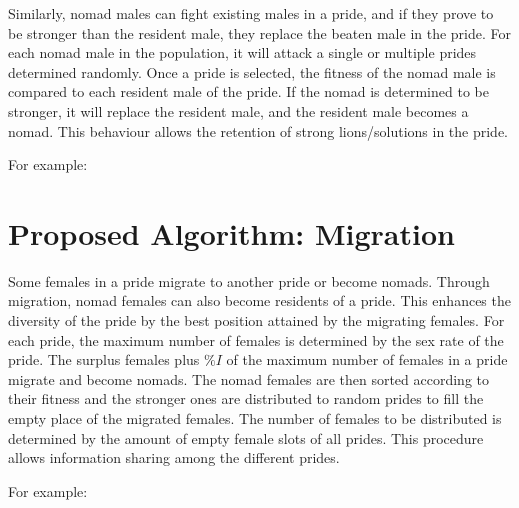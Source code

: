 Similarly, nomad males can fight existing males in a pride, and if they prove to be stronger than the resident male, they replace the beaten male in the pride. For each nomad male in the population, it will attack a single or multiple prides determined randomly. Once a pride is selected, the fitness of the nomad male is compared to each resident male of the pride. If the nomad is determined to be stronger, it will replace the resident male, and the resident male becomes a nomad. This behaviour allows the retention of strong lions/solutions in the pride.

For example:

\section{Proposed Algorithm: Migration}
Some females in a pride migrate to another pride or become nomads. Through migration, nomad females can also become residents of a pride. This enhances the diversity of the pride by the best position attained by the migrating females. For each pride, the maximum number of females is determined by the sex rate of the pride. The surplus females plus $\%I$ of the maximum number of females in a pride migrate and become nomads. The nomad females are then sorted according to their fitness and the stronger ones are distributed to random prides to fill the empty place of the migrated females. The number of females to be distributed is determined by the amount of empty female slots of all prides. This procedure allows information sharing among the different prides.

For example: